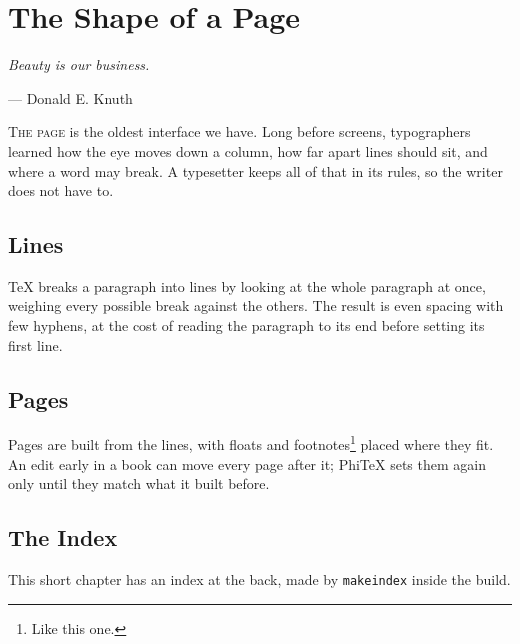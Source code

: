 \documentclass[11pt]{book}
\newcommand{\epigraph}[2]{\begin{flushright}\begin{minipage}{.7\textwidth}\itshape\small #1\par\vspace{2pt}\upshape\hfill--- #2\end{minipage}\end{flushright}\vspace{1.5em}}
\begin{document}
\frontmatter
\tableofcontents

\mainmatter
\chapter{The Shape of a Page}
\epigraph{Beauty is our business.}{Donald E. Knuth}

\lettrine[lines=3]{T}{he page} is the oldest interface we have. Long before
screens, typographers learned how the eye moves down a
column, how far apart lines should sit, and where a word may break. A
typesetter keeps all of that in its rules, so the writer
does not have to.

\section{Lines}
TeX breaks a paragraph into lines by looking at the whole paragraph at
once, weighing every possible break against the
others. The result is even spacing with few hyphens, at
the cost of reading the paragraph to its end before setting its first line.

\section{Pages}
Pages are built from the lines, with floats and
footnotes\footnote{Like this one.} placed where they fit. An edit early in a
book can move every page after it; PhiTeX sets them again only until they
match what it built before.

\section{The Index}
This short chapter has an index at the back, made by
\texttt{makeindex} inside the build.

\backmatter
\printindex
\end{document}
